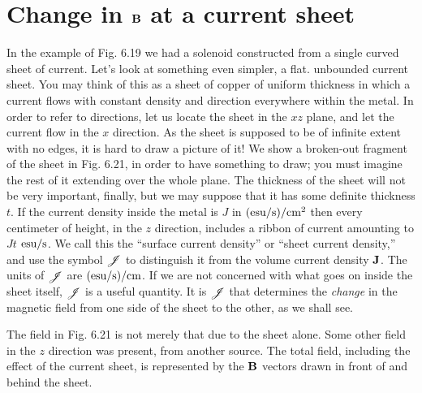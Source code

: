 \section{Change in $\mathbf{B}$ at a current sheet}

In the example of Fig. 6.19 we had a solenoid constructed from a
single curved sheet of current. Let's look at something even simpler,
a flat. unbounded current sheet. You may think of this as a sheet
of copper of uniform thickness in which a current flows with constant
density and direction everywhere within the metal. In order to refer
to directions, let us locate the sheet in the $xz$ plane, and let the current
flow in the $x$ direction. As the sheet is supposed to be of infinite extent
with no edges, it is hard to draw a picture of it! We show a
broken-out fragment of the sheet in Fig. 6.21, in order to have something
to draw; you must imagine the rest of it extending over the
whole plane. The thickness of the sheet will not be very important,
finally, but we may suppose that it has some definite thickness $t$. If
the current density inside the metal is $J$ in $(\textup{esu}/\textup{s})/\textup{cm}^2$ then every
centimeter of height, in the $z$ direction, includes a ribbon of current
amounting to $Jt$ $\textup{esu}/\textup{s}$. We call this 
the ``surface current density''
or ``sheet current density,'' and use the symbol $\mathscr{J}$ to distinguish it from
the volume current density $\mathbf{J}$. The units of $\mathscr{J}$ are $(\textup{esu}/\textup{s})/\textup{cm}$. If
we are not concerned with what goes on inside the sheet itself, $\mathscr{J}$ is
a useful quantity. It is $\mathscr{J}$ that determines the \emph{change} in the magnetic
field from one side of the sheet to the other, as we shall see.

The field in Fig. 6.21 is not merely that due to the sheet alone.
Some other field in the $z$ direction was present, from another source.
The total field, including the effect of the current sheet, is represented
by the $\mathbf{B}$ vectors drawn in front of and behind the sheet.

